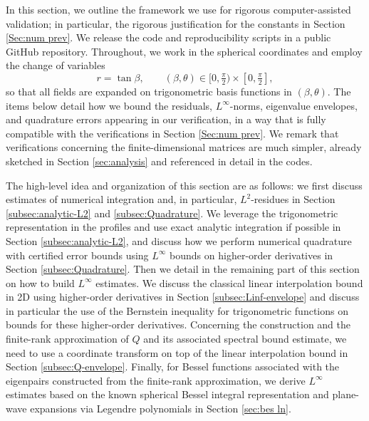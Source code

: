 \documentclass[11pt,a4paper]{article}
\numberwithin{equation}{section}
\begin{document}
In this section, we outline the framework we use for rigorous computer-assisted validation; in particular, the rigorous justification for the constants in Section \ref{Sec:num prev}. %
We release the code and reproducibility scripts in a public GitHub repository. %
Throughout, we work in the spherical coordinates and employ the change of variables
\[
r=\tan\beta,\qquad (\beta,\theta)\in[0,\tfrac{\pi}{2})\times[0,\tfrac{\pi}{2}],
\]
so that all fields are expanded on trigonometric basis functions in $(\beta,\theta)$. The items below detail how we bound the residuals, $\!L^\infty$-norms, eigenvalue envelopes, and quadrature errors appearing in our verification, in a way that is fully compatible with the verifications in Section \ref{Sec:num prev}. We remark that verifications concerning the finite-dimensional matrices are much simpler, already sketched in Section \ref{sec:analysis} and referenced in detail in the codes.

The high-level idea and organization of this section are as follows: we first discuss estimates of numerical integration and, in particular, $L^2$-residues in Section \ref{subsec:analytic-L2} and \ref{subsec:Quadrature}. We leverage the trigonometric representation in the profiles and use exact analytic integration if possible in Section \ref{subsec:analytic-L2}, and discuss how we perform numerical quadrature with certified error bounds using $L^\infty$ bounds on higher-order derivatives in Section \ref{subsec:Quadrature}. Then we detail in the remaining part of this section on how to build $L^\infty$ estimates. We discuss the classical linear interpolation bound in 2D using higher-order derivatives in Section \ref{subsec:Linf-envelope} and discuss in particular the use of the Bernstein inequality for trigonometric functions on bounds for these higher-order derivatives. Concerning the construction and the finite-rank approximation of $Q$ and its associated spectral bound estimate, we need to use a coordinate transform on top of the linear interpolation bound in Section \ref{subsec:Q-envelope}. Finally, for Bessel functions associated with the eigenpairs constructed from the finite-rank approximation, we derive $L^\infty$ estimates based on the known spherical Bessel integral representation and  plane-wave expansions via Legendre polynomials in Section \ref{sec:bes ln}.
\end{document}
